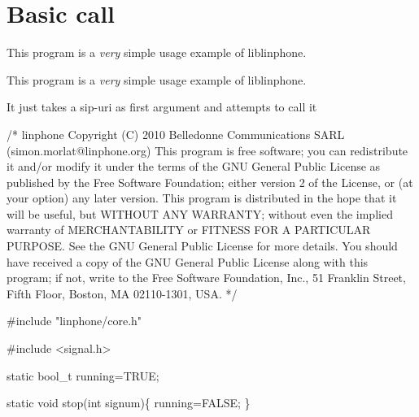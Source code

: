 \section{Basic call}
\label{group__basic__call__tutorials}


This program is a {\itshape very} simple usage example of liblinphone.  


This program is a {\itshape very} simple usage example of liblinphone. 

It just takes a sip-\/uri as first argument and attempts to call it


\begin{DoxyCodeInclude}

\textcolor{comment}{/*}
\textcolor{comment}{linphone}
\textcolor{comment}{Copyright (C) 2010  Belledonne Communications SARL }
\textcolor{comment}{ (simon.morlat@linphone.org)}
\textcolor{comment}{}
\textcolor{comment}{This program is free software; you can redistribute it and/or}
\textcolor{comment}{modify it under the terms of the GNU General Public License}
\textcolor{comment}{as published by the Free Software Foundation; either version 2}
\textcolor{comment}{of the License, or (at your option) any later version.}
\textcolor{comment}{}
\textcolor{comment}{This program is distributed in the hope that it will be useful,}
\textcolor{comment}{but WITHOUT ANY WARRANTY; without even the implied warranty of}
\textcolor{comment}{MERCHANTABILITY or FITNESS FOR A PARTICULAR PURPOSE.  See the}
\textcolor{comment}{GNU General Public License for more details.}
\textcolor{comment}{}
\textcolor{comment}{You should have received a copy of the GNU General Public License}
\textcolor{comment}{along with this program; if not, write to the Free Software}
\textcolor{comment}{Foundation, Inc., 51 Franklin Street, Fifth Floor, Boston, MA  02110-1301, USA.}
\textcolor{comment}{*/}

\textcolor{preprocessor}{#include "linphone/core.h"}

\textcolor{preprocessor}{#include <signal.h>}

\textcolor{keyword}{static} bool\_t running=TRUE;

\textcolor{keyword}{static} \textcolor{keywordtype}{void} stop(\textcolor{keywordtype}{int} signum)\{
        running=FALSE;
\}


\end{DoxyCodeInclude}
